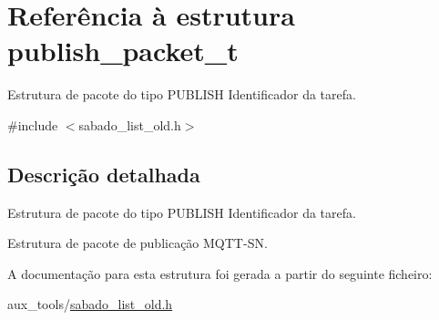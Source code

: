\hypertarget{structpublish__packet__t}{\section{Referência à estrutura publish\+\_\+packet\+\_\+t}
\label{structpublish__packet__t}
}


Estrutura de pacote do tipo P\+U\+B\+L\+I\+S\+H Identificador da tarefa.  




{\ttfamily \#include $<$sabado\+\_\+list\+\_\+old.\+h$>$}



\subsection{Descrição detalhada}
Estrutura de pacote do tipo P\+U\+B\+L\+I\+S\+H Identificador da tarefa. 

Estrutura de pacote de publicação M\+Q\+T\+T-\/\+S\+N. 

A documentação para esta estrutura foi gerada a partir do seguinte ficheiro\+:\begin{DoxyCompactItemize}
\item 
aux\+\_\+tools/\hyperlink{sabado__list__old_8h}{sabado\+\_\+list\+\_\+old.\+h}\end{DoxyCompactItemize}
